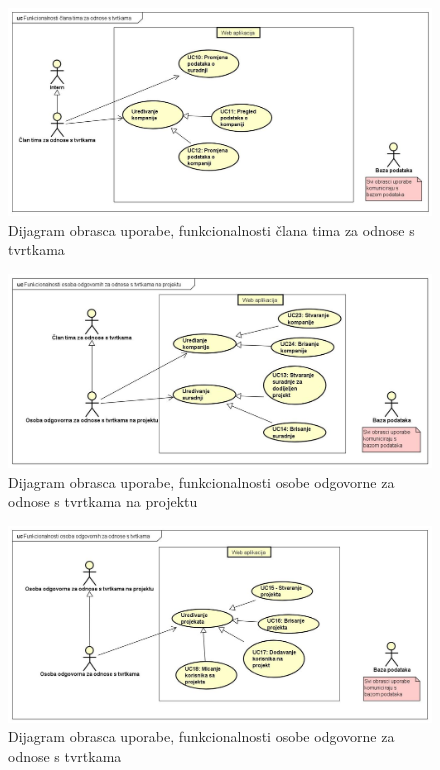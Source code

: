 					\begin{figure}[H]
						\includegraphics[scale=0.4]{slike/UC dijagrami/UseCase FR team member}
						\centering
						\caption{Dijagram obrasca uporabe, funkcionalnosti člana tima za odnose s tvrtkama}
						\label{fig:frTeamMember}
					\end{figure}

					\begin{figure}[H]
						\includegraphics[scale=0.4]{slike/UC dijagrami/UseCase FR responsible}
						\centering
						\caption{Dijagram obrasca uporabe, funkcionalnosti osobe odgovorne za odnose s tvrtkama na projektu}
						\label{fig:frResponsible}
					\end{figure}

					\begin{figure}[H]
						\includegraphics[scale=0.4]{slike/UC dijagrami/UseCase moderator}
						\centering
						\caption{Dijagram obrasca uporabe, funkcionalnosti osobe odgovorne za odnose s tvrtkama}
						\label{fig:frModerator}
					\end{figure}

